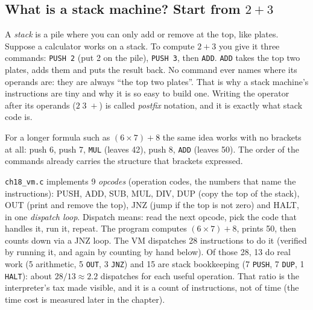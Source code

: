 \subsection*{What is a stack machine? Start from $2+3$}

A \emph{stack} is a pile where you can only add or remove at the top, like
plates. Suppose a calculator works on a stack. To compute $2+3$ you give it
three commands: \texttt{PUSH 2} (put 2 on the pile), \texttt{PUSH 3}, then
\texttt{ADD}. \texttt{ADD} takes the top two plates, adds them and puts
the result back. No command ever names where its operands are: they are always
``the top two plates''. That is why a stack machine's instructions are tiny
and why it is so easy to build one. Writing the operator after its
operands ($2\;3\;+$) is called \emph{postfix} notation, and it is exactly what
stack code is.

For a longer formula such as $(6\times7)+8$ the same idea works with no
brackets at all: push 6, push 7, \texttt{MUL} (leaves 42), push 8,
\texttt{ADD} (leaves 50). The order of the commands already carries the
structure that brackets expressed.


\texttt{ch18\_vm.c} implements 9 \emph{opcodes} (operation codes, the
numbers that name the instructions): PUSH, ADD, SUB, MUL,
DIV, DUP (copy the top of the stack), OUT (print and remove the top),
JNZ (jump if the top is not zero) and HALT, in one \emph{dispatch loop}.
Dispatch means: read the next opcode, pick the code that handles it,
run it, repeat. The program
computes $(6{\times}7)+8$, prints 50, then counts down via a JNZ
loop. The VM dispatches 28 instructions to do it (verified by running it,
and again by counting by hand below). Of those 28, 13 do real work
(5 arithmetic, 5 \texttt{OUT}, 3 \texttt{JNZ}) and 15 are stack
bookkeeping (7 \texttt{PUSH}, 7 \texttt{DUP}, 1 \texttt{HALT}): about
$28/13\approx 2.2$ dispatches for each useful operation. That ratio is
the interpreter's tax made visible, and it is a count of instructions,
not of time (the time cost is measured later in the chapter).




